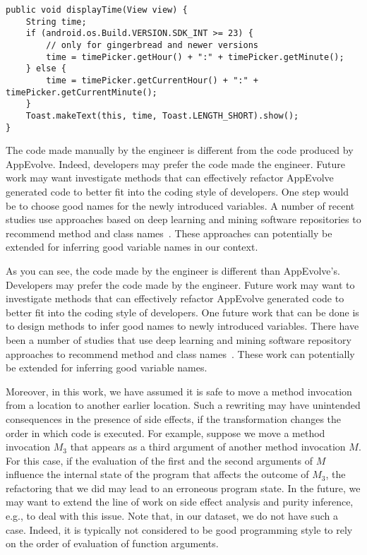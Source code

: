 \vspace{0.2cm}
\begin{lstlisting}[language=text,numbers=none]
public void displayTime(View view) {
    String time;
    if (android.os.Build.VERSION.SDK_INT >= 23) {
        // only for gingerbread and newer versions
        time = timePicker.getHour() + ":" + timePicker.getMinute();
    } else {
        time = timePicker.getCurrentHour() + ":" + timePicker.getCurrentMinute();
    }
    Toast.makeText(this, time, Toast.LENGTH_SHORT).show();
}
\end{lstlisting}

The code made manually by the engineer is different from the code produced
by AppEvolve. Indeed, developers may prefer the code made the
engineer. Future work may want investigate methods that can effectively
refactor AppEvolve generated code to better fit into the coding style of
developers. One step would be to choose good names for the newly introduced
variables. A number of recent studies use approaches based on deep learning
and mining software repositories to recommend method and class
names~\cite{...}. These approaches can potentially be extended for inferring good
variable names in our context.

As you can see, the code made by the engineer is different than AppEvolve's. Developers may prefer the code made by the engineer. Future work may want to investigate methods that can effectively refactor AppEvolve generated code to better fit into the coding style of developers. One future work that can be done is to design methods to infer good names to newly introduced variables. There have been a number of studies that use deep learning and mining software repository approaches to recommend method and class names~\cite{allamanis2015suggesting}. These work can potentially be extended for inferring good variable names.


Moreover, in this work, we have assumed it is safe to move a method
invocation from a location to another earlier location. Such a rewriting
may have unintended consequences in the presence of side effects, if the
transformation changes the order in which code is executed.  For example,
suppose we move a method invocation $M_3$ that appears as a third argument
of another method invocation $M$. For this case, if the evaluation of the
first and the second arguments of $M$ influence the internal state of the
program that affects the outcome of $M_3$, the refactoring that we did may
lead to an erroneous program state. In the future, we may want to extend
the line of work on side effect analysis and purity inference, e.g., to
deal with this issue. Note that, in our dataset, we do not have such a
case.  Indeed, it is typically not considered to be good programming style
to rely on the order of evaluation of function arguments.





